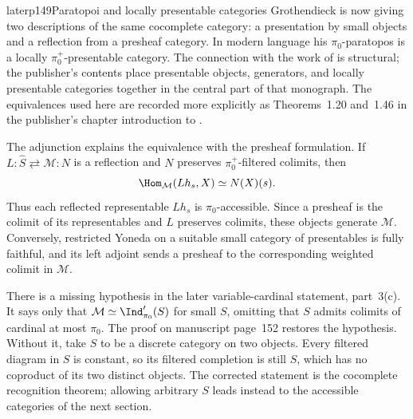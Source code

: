 \begin{dcomment}{later}{p149}{Paratopoi and locally presentable categories}
Grothendieck is now giving two descriptions of the same cocomplete category: a presentation by small objects and a reflection from a presheaf category. In modern language his $\pi_0$-paratopos is a locally $\pi_0^+$-presentable category. The connection with the work of \citet{GabrielUlmer1971} is structural; the publisher's contents place presentable objects, generators, and locally presentable categories together in the central part of that monograph. The equivalences used here are recorded more explicitly as Theorems~1.20 and~1.46 in the publisher's chapter introduction to \citet{AdamekRosicky1994}.

The adjunction explains the equivalence with the presheaf formulation. If
$L:\widehat S\rightleftarrows\mathcal M:N$ is a reflection and $N$ preserves $\pi_0^+$-filtered colimits, then
\[
 \Hom_{\mathcal M}(Lh_s,X)\simeq N(X)(s).
\]
Thus each reflected representable $Lh_s$ is $\pi_0$-accessible. Since a presheaf is the colimit of its representables and $L$ preserves colimits, these objects generate $\mathcal M$. Conversely, restricted Yoneda on a suitable small category of presentables is fully faithful, and its left adjoint sends a presheaf to the corresponding weighted colimit in $\mathcal M$.

There is a missing hypothesis in the later variable-cardinal statement, part~3(c). It says only that $\mathcal M\simeq\Ind'_{\pi_0}(S)$ for small $S$, omitting that $S$ admits colimits of cardinal at most $\pi_0$. The proof on manuscript page~152 restores the hypothesis. Without it, take $S$ to be a discrete category on two objects. Every filtered diagram in $S$ is constant, so its filtered completion is still $S$, which has no coproduct of its two distinct objects. The corrected statement is the cocomplete recognition theorem; allowing arbitrary $S$ leads instead to the accessible categories of the next section.
\end{dcomment}

